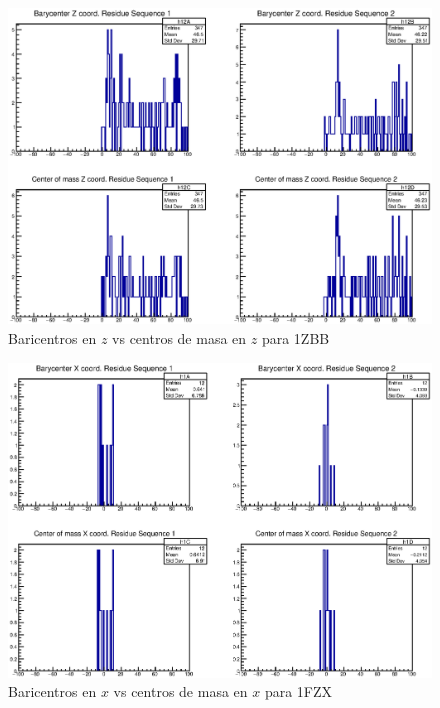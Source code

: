 \begin{figure}[htbp]
    \centering
    \includegraphics[width=1\linewidth]{./Figures/can3.eps}
  \caption[Baricentros en $z$ vs centros de masa en $z$ para 1ZBB]{Baricentros en $z$ vs centros de masa en $z$ para 1ZBB}
    \label{fig:canz}
\end{figure}




\begin{figure}[htbp]
    \centering
    \includegraphics[width=1\linewidth]{./Figures/1fzx.eps}
  \caption[Baricentros en $x$ vs centros de masa en $x$ para 1FZX]{Baricentros en $x$ vs centros de masa en $x$ para 1FZX}
    \label{fig:cax}
\end{figure}

